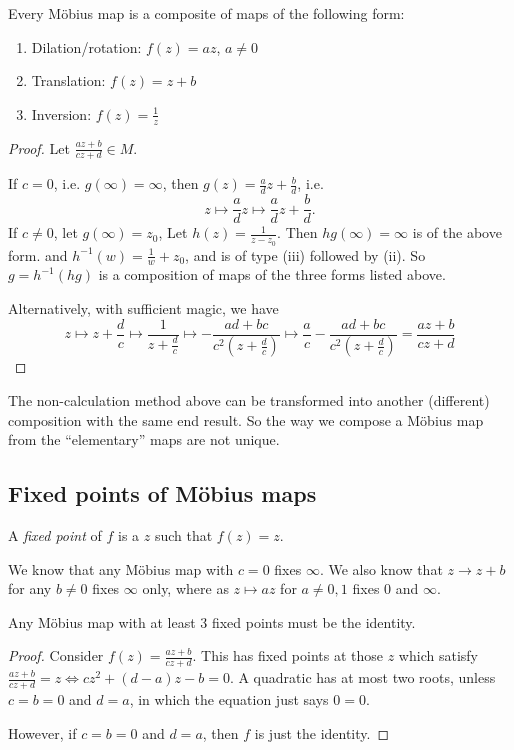 \documentclass[a4pape]{article}
\begin{document}
\begin{prop}
  Every M\"obius map is a composite of maps of the following form:
  \begin{enumerate}
  \item Dilation/rotation: $f(z) = az$, $a\not= 0$
  \item Translation: $f(z) = z + b$
  \item Inversion: $f(z) = \frac{1}{z}$
  \end{enumerate}
\end{prop}
\begin{proof}
  Let $\frac{az + b}{cz + d}\in M$.

  If $c = 0$, i.e. $g(\infty) = \infty$, then $g(z) = \frac{a}{d}z + \frac{b}{d}$, i.e.
  \[
  z\mapsto \frac{a}{d} z\mapsto \frac{a}{d}z + \frac{b}{d}.
  \]
  If $c\not= 0$, let $g(\infty)=z_0$, Let $h(z) = \frac{1}{z - z_0}$. Then $hg(\infty) = \infty$ is of the above form. and $h^{-1}(w) = \frac{1}{w} + z_0$, and is of type (iii) followed by (ii). So $g = h^{-1} (hg)$ is a composition of maps of the three forms listed above.

  Alternatively, with sufficient magic, we have
  \[
  z\mapsto z + \frac{d}{c} \mapsto \frac{1}{z + \frac{d}{c}} \mapsto -\frac{ad + bc}{c^2(z + \frac{d}{c})}\mapsto \frac{a}{c} -\frac{ad + bc}{c^2(z + \frac{d}{c})} = \frac{az + b}{cz + d}
  \]
\end{proof}
\note The non-calculation method above can be transformed into another (different) composition with the same end result. So the way we compose a M\"obius map from the ``elementary'' maps are not unique.

\subsection{Fixed points of M\"obius maps}
\begin{defi}
  A \emph{fixed point} of $f$ is a $z$ such that $f(z) = z$.
\end{defi}

We know that any M\"obius map with $c = 0$ fixes $\infty$. We also know that $z\to z + b$ for any $b\not= 0$ fixes $\infty$ only, where as $z\mapsto az$ for $a\not= 0, 1$ fixes $0$ and $\infty$.

\begin{prop}
  Any M\"obius map with at least 3 fixed points must be the identity. 
\end{prop}

\begin{proof}
  Consider $f(z) = \frac{az + b}{cz + d}$. This has fixed points at those $z$ which satisfy $\frac{az + b}{cz + d} = z \Leftrightarrow cz^2 + (d - a)z - b = 0$. A quadratic has at most two roots, unless $c = b = 0$ and $d = a$, in which the equation just says $0 = 0$.

However, if $c = b= 0$ and $d = a$, then $f$ is just the identity. 
\end{proof}
\end{document}
